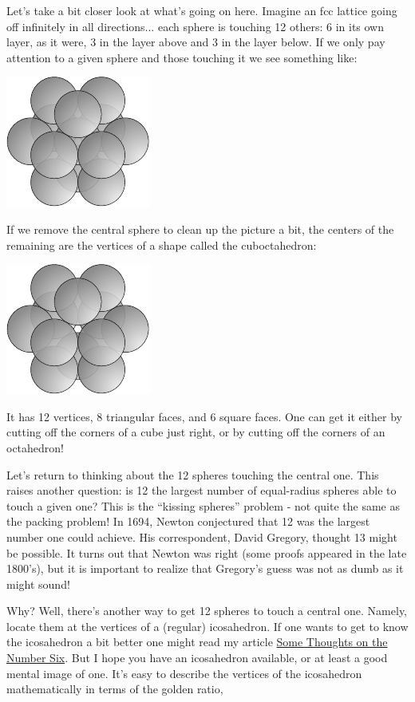 Let's take a bit closer look at what's going on here. Imagine an fcc lattice going off infinitely in all directions... each sphere is touching 12 others: 6 in its own layer, as it were, 3 in the layer above and 3 in the layer below. If we only pay attention to a given sphere and those touching it we see something like:
\begin{center}
\includegraphics[]{figures/wk20_fig4.pdf}
\end{center}
If we remove the central sphere to clean up the picture a bit, the centers of the remaining are the vertices of a shape called the cuboctahedron:
\begin{center}
\includegraphics[]{figures/wk20_fig5.pdf}
\end{center}
It has 12 vertices, 8 triangular faces, and 6 square faces. One can get it either by cutting off the corners of a cube just right, or by cutting off the corners of an octahedron!

Let's return to thinking about the 12 spheres touching the central one. This raises another question: is 12 the largest number of equal-radius spheres able to touch a given one? This is the ``kissing spheres'' problem - not quite the same as the packing problem! In 1694, Newton conjectured that 12 was the largest number one could achieve. His correspondent, David Gregory, thought 13 might be possible. It turns out that Newton was right (some proofs appeared in the late 1800's), but it is important to realize that Gregory's guess was not as dumb as it might sound!

Why? Well, there's another way to get 12 spheres to touch a central one. Namely, locate them at the vertices of a (regular) icosahedron. If one wants to get to know the icosahedron a bit better one might read my article \href{http://math.ucr.edu/home/baez/six.html}{Some Thoughts on the Number Six}. But I hope you have an icosahedron available, or at least a good mental image of one. It's easy to describe the vertices of the icosahedron mathematically in terms of the golden ratio,

